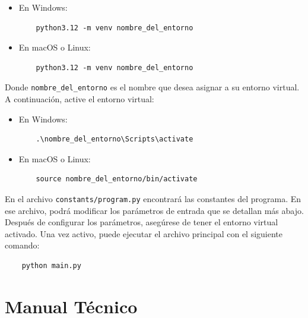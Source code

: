 \documentclass{article}
\begin{document}
\begin{itemize}
  \item En Windows:
  \begin{verbatim}
    python3.12 -m venv nombre_del_entorno
  \end{verbatim}
  \item En macOS o Linux:
  \begin{verbatim}
    python3.12 -m venv nombre_del_entorno
  \end{verbatim}
\end{itemize}

Donde \texttt{nombre\_del\_entorno} es el nombre que desea asignar a su entorno virtual. 
A continuación, active el entorno virtual:

\begin{itemize}
  \item En Windows:
  \begin{verbatim}
    .\nombre_del_entorno\Scripts\activate
  \end{verbatim}
  \item En macOS o Linux:
  \begin{verbatim}
    source nombre_del_entorno/bin/activate
  \end{verbatim}
\end{itemize}

En el archivo \texttt{constants/program.py} encontrará las constantes del programa. 
En ese archivo, podrá modificar los parámetros de entrada que se detallan más abajo.\\

Después de configurar los parámetros, asegúrese de tener el entorno virtual activado. 
Una vez activo, puede ejecutar el archivo principal con el siguiente comando:

\begin{center}
  \begin{adjustbox}{minipage=\linewidth, center}
  \begin{verbatim}
    python main.py
  \end{verbatim}
  \end{adjustbox}
\end{center}


\section{Manual Técnico}\label{sec:man_t}
\end{document}
